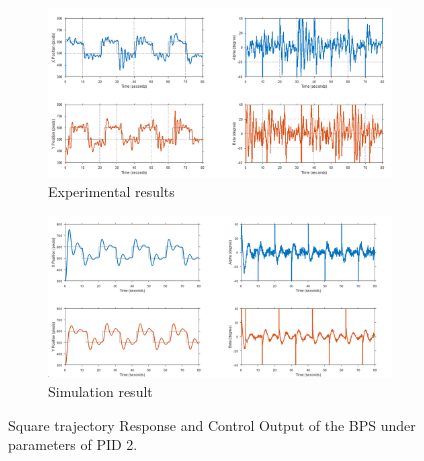 \begin{figure}[h]
     \centering
     \begin{subfigure}[b]{1\textwidth}
         \centering
         \includegraphics[width=\textwidth]{Figures/chapter05/square_tracking_PID2_Expiremental.png}
         \caption{Experimental results}
         \label{fig:y equals x}
     \end{subfigure}
     \hfill
     \begin{subfigure}[b]{1\textwidth}
         \centering
         \includegraphics[width=\textwidth]{Figures/chapter05/square_tracking_PID2_simulation.png}
         \caption{Simulation result}
         \label{fig:three sin x}
     \end{subfigure}
        \caption{Square trajectory Response and Control Output of the  BPS under parameters of PID 2.}
        \label{fig:three graphs}
\end{figure}
